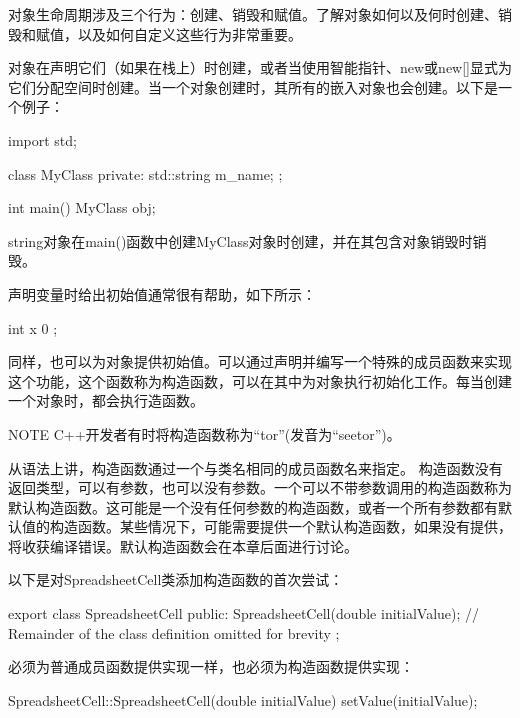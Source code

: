 
对象生命周期涉及三个行为：创建、销毁和赋值。了解对象如何以及何时创建、销毁和赋值，以及如何自定义这些行为非常重要。


对象在声明它们（如果在栈上）时创建，或者当使用智能指针、new或new[]显式为它们分配空间时创建。当一个对象创建时，其所有的嵌入对象也会创建。以下是一个例子：

\begin{cpp}
import std;

class MyClass
{
    private:
    std::string m_name;
};

int main()
{
    MyClass obj;
}
\end{cpp}

string对象在main()函数中创建MyClass对象时创建，并在其包含对象销毁时销毁。

声明变量时给出初始值通常很有帮助，如下所示：

\begin{cpp}
int x { 0 };
\end{cpp}

同样，也可以为对象提供初始值。可以通过声明并编写一个特殊的成员函数来实现这个功能，这个函数称为构造函数，可以在其中为对象执行初始化工作。每当创建一个对象时，都会执行造函数。

\begin{myNotic}{NOTE}
C++开发者有时将构造函数称为“tor”(发音为“seetor”)。
\end{myNotic}


从语法上讲，构造函数通过一个与类名相同的成员函数名来指定。 构造函数没有返回类型，可以有参数，也可以没有参数。一个可以不带参数调用的构造函数称为默认构造函数。这可能是一个没有任何参数的构造函数，或者一个所有参数都有默认值的构造函数。某些情况下，可能需要提供一个默认构造函数，如果没有提供，将收获编译错误。默认构造函数会在本章后面进行讨论。

以下是对SpreadsheetCell类添加构造函数的首次尝试：

\begin{cpp}
export class SpreadsheetCell
{
    public:
        SpreadsheetCell(double initialValue);
        // Remainder of the class definition omitted for brevity
};
\end{cpp}

必须为普通成员函数提供实现一样，也必须为构造函数提供实现：

\begin{cpp}
SpreadsheetCell::SpreadsheetCell(double initialValue)
{
    setValue(initialValue);
}
\end{cpp}

